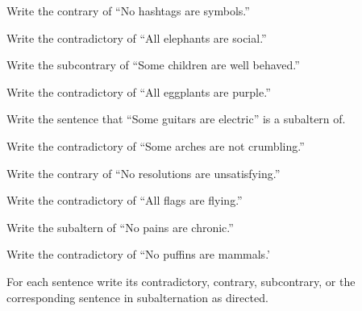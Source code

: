 \begin{exercises}
\item Write the contrary of ``No hashtags are symbols.'' 

\item Write the contradictory of ``All elephants are social.'' 

\item Write the subcontrary of ``Some children are well behaved.'' 

\item Write the contradictory of ``All eggplants are purple.'' 

\item Write the sentence that ``Some guitars are electric'' is a subaltern of.  

 \item Write the contradictory of  ``Some arches are not crumbling.'' 

\item Write the contrary of ``No resolutions are unsatisfying.'' 

 \item Write the contradictory of  ``All flags are flying.'' 

\item Write the subaltern of ``No pains are chronic.'' 

\item Write the contradictory of  ``No puffins are mammals.'
\end{exercises}


\noindent \problempart For each sentence write its contradictory, contrary, subcontrary, or the corresponding sentence in subalternation as directed.

